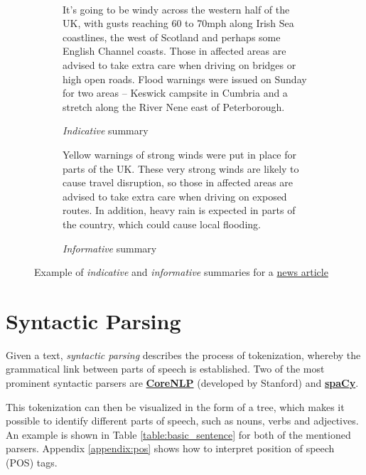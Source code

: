 \begin{figure}[H]\
\begin{subfigure}{\textwidth}
\begin{displayquote}
It’s going to be windy across the western half of the UK, with gusts reaching 60 to 70mph along Irish Sea coastlines, the west of Scotland and perhaps some English Channel coasts. Those in affected areas are advised to take extra care when driving on bridges or high open roads. Flood warnings were issued on Sunday for two areas – Keswick campsite in Cumbria and a stretch along the River Nene east of Peterborough.
\end{displayquote}
\caption{\textit{Indicative} summary}
\vspace{\baselineskip}
\end{subfigure}
\begin{subfigure}{\textwidth}
\begin{displayquote}
Yellow warnings of strong winds were put in place for parts of the UK. These very strong winds are likely to cause travel disruption, so those in affected areas are advised to take extra care when driving on exposed routes. In addition, heavy rain is expected in parts of the country, which could cause local flooding.
\caption{\textit{Informative} summary}
\end{displayquote}
\end{subfigure}
\caption{Example of \textit{indicative} and \textit{informative} summaries for a \href{https://www.theguardian.com/uk-news/2020/jan/12/storm-brendan-gales-forecast-uk}{news article}}
\label{fig:indicative_informative_summaries}
\end{figure}

\section{Syntactic Parsing}

Given a text, \textit{syntactic parsing} \cite{noauthor_syntactic_nodate} describes the process of tokenization, whereby the grammatical link between parts of speech is established.
Two of the most prominent syntactic parsers are \textbf{\href{https://corenlp.run}{CoreNLP}} (developed by Stanford) and \textbf{\href{https://spacy.io}{spaCy}}.

This tokenization can then be visualized in the form of a tree, which makes it possible to identify different parts of speech, such as nouns, verbs and adjectives. An example is shown in Table \ref{table:basic_sentence} for both of the mentioned parsers. Appendix \ref{appendix:pos} shows how to interpret position of speech (POS) tags.


